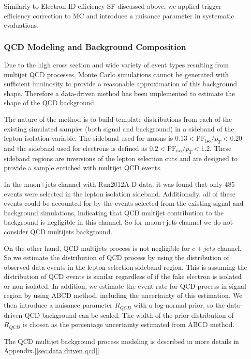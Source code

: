 \documentclass{cmspaperpdf}
\begin{document}
Similarly to Electron ID efficiency SF discussed above, we applied trigger efficiency correction to MC and introduce a nuisance parameter in systematic evaluations. 


\subsubsection{QCD Modeling and Background Composition}

Due to the high cross section and wide variety of event types resulting from multijet QCD processes, Monte Carlo simulations cannot be generated with sufficient luminosity to provide a reasonable approximation of this background shape. Therefore a data-driven method has been implemented to estimate the shape of the QCD background.

The nature of the method is to build template distributions from each of the existing simulated samples (both signal and background) in a sideband of the lepton isolation variable. The sideband used for muons is $0.13<\mathrm{PF}_\mathrm{iso}/p_{T}<0.20$ and the sideband used for electrons is defined as  $0.2<\mathrm{PF}_\mathrm{iso}/p_{T}<1.2$. These sideband regions are inversions of the lepton selection cuts and are designed to provide a sample enriched with multijet QCD events.

In the muon+jets channel with Run2012A-D data, it was found that only 485 events were selected in the lepton isolation sideband. Additionally, all of these events could be accounted for by the events selected from the existing signal and background simulations, indicating that QCD multijet contribution to the background is negligible in this channel. So for muon+jets channel we do not consider QCD multijets background.

On the other hand, QCD multijets process is not negligible for $e+jets$ channel. So we estimate the distribution of QCD process by using the distribution of observed data events in the lepton selection sideband region. This is assuming the distribution of QCD events is similar regardless of if the fake electron is isolated or non-isolated. In addition, we estimate the event rate for QCD process in signal region by using ABCD method, including the uncertainty of this estimation. We then introduce a nuisance parameter $R_{QCD}$ with a log-normal prior, so the data-driven QCD background can be scaled. The width of the prior distribution of $R_{QCD}$ is chosen as the percentage uncertainty estimated from ABCD method. 

The QCD multijet background process modeling is described in more details in Appendix.[\ref{sec:data driven qcd}]
\end{document}
